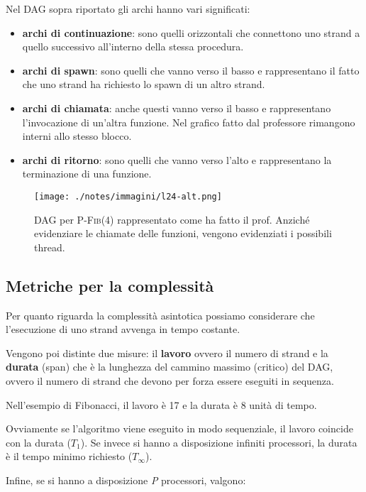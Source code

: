 Nel DAG sopra riportato gli archi hanno vari significati:

\begin{itemize}
	\item \textbf{archi di continuazione}: sono quelli orizzontali che connettono uno strand a quello successivo all'interno della stessa procedura.
	\item \textbf{archi di spawn}: sono quelli che vanno verso il basso e rappresentano il fatto che uno strand ha richiesto lo spawn di un altro strand.
	\item \textbf{archi di chiamata}: anche questi vanno verso il basso e rappresentano l'invocazione di un'altra funzione. Nel grafico fatto dal professore rimangono interni allo stesso blocco.
	\item \textbf{archi di ritorno}: sono quelli che vanno verso l'alto e rappresentano la terminazione di una funzione.
\end{itemize}

\begin{figure}[htbp]
	\centering
	\texttt{[image: ./notes/immagini/l24-alt.png]}
	\caption{DAG per \textsc{P-Fib}(4) rappresentato come ha fatto il prof. Anziché evidenziare le chiamate delle funzioni, vengono evidenziati i possibili thread.}
\end{figure}

\subsection{Metriche per la complessità}\label{metriche-per-la-complessituxe0}

Per quanto riguarda la complessità asintotica possiamo considerare che l'esecuzione di uno strand avvenga in tempo costante.

Vengono poi distinte due misure: il \textbf{lavoro} ovvero il numero di strand e la \textbf{durata} (span) che è la lunghezza del cammino massimo (critico) del DAG, ovvero il numero di strand che devono per forza essere eseguiti in sequenza.

Nell'esempio di Fibonacci, il lavoro è 17 e la durata è 8 unità di tempo.

Ovviamente se l'algoritmo viene eseguito in modo sequenziale, il lavoro coincide con la durata ($T_1$). 
Se invece si hanno a disposizione infiniti processori, la durata è il tempo minimo richiesto ($T_\infty$). 

Infine, se si hanno a disposizione \emph{P} processori, valgono:

